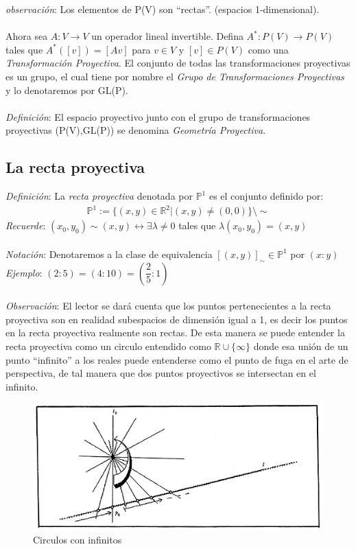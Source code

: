 \documentclass[10pt,a4paper]{article}
\begin{document}
\textit{observación}: Los elementos de P(V) son ``rectas''. (espacios 1-dimensional).
\\
\\
Ahora sea $A: V \rightarrow V $ un operador lineal invertible.
Defina $A^{*}: P(V) \rightarrow P(V)$ tales que $A^{*}([v])=[Av]$ para $v \in V$ y $[v] \in P(V)$ como una \textit{Transformación Proyectiva}. El conjunto de todas las transformaciones proyectivas es un grupo, el cual tiene por nombre el \textit{Grupo de Transformaciones Proyectivas} y lo denotaremos por GL(P). 
\\
\\
\textit{Definición}: El espacio proyectivo junto con el grupo de transformaciones proyectivas (P(V),GL(P)) se denomina \textit{Geometría Proyectiva}.

\subsection{La recta proyectiva}

\textit{Definición}: La \textit{recta proyectiva} denotada por $\mathbb{P}^{1}$ es el conjunto definido por:
\begin{align*}
\mathbb{P}^{1} := \lbrace(x,y) \in \mathbb{R}^{2} | (x,y) \neq (0,0)\rbrace \setminus \sim
\end{align*}
\textit{Recuerde}: $(x_{0},y_{0})\sim (x,y) \leftrightarrow \exists \lambda \neq 0$ tales que $\lambda(x_{0},y_{0})=(x,y)$
\\
\\
\textit{Notación}: Denotaremos a la clase de equivalencia $[(x,y)]_{\sim} \in \mathbb{P}^{1}$ por $(x:y)$
\textit{Ejemplo}: $(2:5)=(4:10)=(\dfrac{2}{5}:1)$
\\
\\
\textit{Observación}: El lector se dará cuenta que los puntos pertenecientes a la recta proyectiva son en realidad subespacios de dimensión igual a 1, es decir los puntos en la recta proyectiva realmente son rectas. De esta manera se puede entender la recta proyectiva como un circulo entendido como $\mathbb{R}\cup \lbrace\infty\rbrace$ donde esa unión de un punto ``infinito'' a los reales puede entenderse como el punto de fuga en el arte de perspectiva, de tal manera que dos puntos proyectivos se intersectan en el infinito.


\begin{figure}[h!]
    \centering
    \includegraphics[scale=0.5]{imagen2.png}
    \caption{Circulos con infinitos}
\end{figure}
\end{document}
